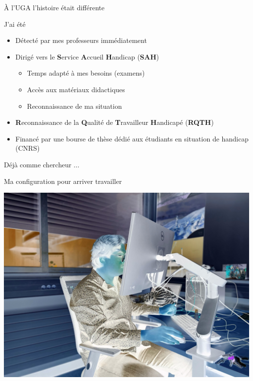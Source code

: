 \documentclass{beamer}
\begin{document}
\begin{frame}
{À l'UGA l'histoire était différente}

J'ai été  \pause
{\small
\begin{itemize} \pause
 \item Détecté par mes professeurs immédiatement \pause
 \item Dirigé vers le \textbf{S}ervice \textbf{A}ccueil \textbf{H}andicap (\textbf{SAH}) \pause
  \begin{itemize}
   \item Temps adapté à mes besoins (examens) \pause
   \item Accès aux matériaux didactiques  \pause
   \item Reconnaissance de ma situation  \pause
  \end{itemize}
 \item \textbf{R}econnaissance de la \textbf{Q}ualité de \textbf{T}ravailleur \textbf{H}andicapé
 (\textbf{RQTH}) \pause
 \item Financé par une bourse de thèse dédié aux étudiants en situation de handicap (CNRS)
\end{itemize}
} 
 
\end{frame}



\begin{frame}

 \centering
 \LARGE Déjà comme chercheur ... 
 
\end{frame}



\begin{frame}
 {Ma configuration pour arriver travailler}
 
  \includegraphics[width=1\linewidth]{images/photos/2/image2_neg.jpeg}  
 
\end{frame}
\end{document}
